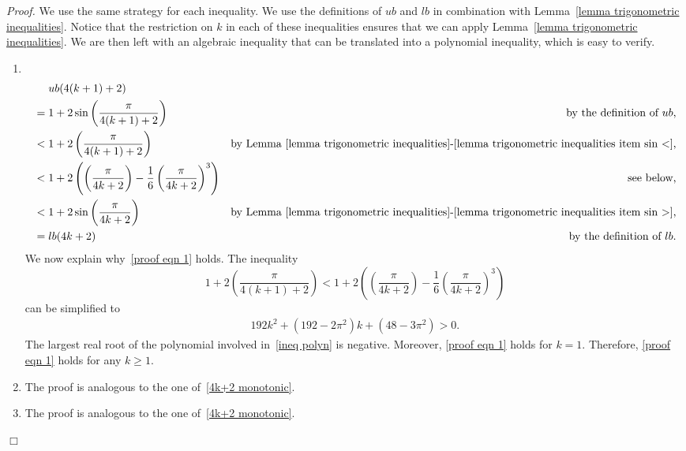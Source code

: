 \documentclass[12pt]{article}
\newenvironment{proof}{\emph{Proof.}}{\hfill $\Box$\\}
\def\Item{\item\abovedisplayskip=0pt\abovedisplayshortskip=0pt~\vspace*{-\baselineskip}}
\begin{document}
\begin{proof}
We use the same strategy for each inequality. We use the definitions of $ub$ and $lb$ in combination with Lemma~\ref{lemma trigonometric inequalities}. Notice that the restriction on $k$ in each of these inequalities ensures that we can apply Lemma~\ref{lemma trigonometric inequalities}. We are then left with an algebraic inequality that can be translated into a polynomial inequality, which is easy to verify. 
\begin{enumerate}
\Item 
\begin{align}
\nonumber & ~~~~ ub(4(k+1)+2) \\
\nonumber & = 1+2\sin\left(\frac{\pi}{4(k+1)+2}\right) & \textrm{by the definition of $ub$,} \\
\nonumber & < 1 + 2 \left(\frac{\pi}{4(k+1)+2}\right) & \textrm{by Lemma~\ref{lemma trigonometric inequalities}-\ref{lemma trigonometric inequalities item sin <},} \\
\label{proof eqn 1} & < 1 + 2\left(\left(\frac{\pi}{4k+2}\right)-\frac{1}{6}\left(\frac{\pi}{4k+2}\right)^3\right) & \textrm{see below,}\\
\nonumber & < 1+2\sin\left(\frac{\pi}{4k+2}\right) & \textrm{by Lemma~\ref{lemma trigonometric inequalities}-\ref{lemma trigonometric inequalities item sin >},} \\
\nonumber & = lb(4k+2) & \textrm{by the definition of $lb$.}
\end{align}
We now explain why~\eqref{proof eqn 1} holds. The inequality \[1+2\left(\frac{\pi}{4(k+1)+2}\right) < 1 + 2\left(\left(\frac{\pi}{4k+2}\right)-\frac{1}{6}\left(\frac{\pi}{4k+2}\right)^3\right)\] can be simplified to
\begin{align}
\label{ineq polyn}
192k^2 + \left(192-2\pi^2\right) k +\left(48-3\pi^2\right) > 0.
\end{align}
The largest real root of the polynomial involved in~\eqref{ineq polyn} is negative. Moreover, \eqref{proof eqn 1} holds for $k=1$. Therefore, \eqref{proof eqn 1} holds for any $k\geq 1$.

\item The proof is analogous to the one of~\eqref{4k+2 monotonic}.

\item The proof is analogous to the one of~\eqref{4k+2 monotonic}.


\end{enumerate}
\end{proof}
\end{document}
